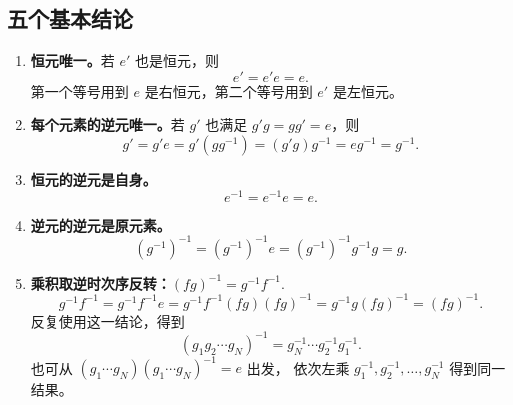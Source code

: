 \subsection{五个基本结论}
\begin{enumerate}
\item \textbf{恒元唯一。}若 $e'$ 也是恒元，则
\begin{equation}
e'=e'e=e.
\end{equation}
第一个等号用到 $e$ 是右恒元，第二个等号用到 $e'$ 是左恒元。

\item \textbf{每个元素的逆元唯一。}若 $g'$ 也满足 $g'g=gg'=e$，则
\begin{equation}
g'=g'e=g'\left(gg^{-1}\right)=\left(g'g\right)g^{-1}=eg^{-1}=g^{-1}.
\end{equation}

\item \textbf{恒元的逆元是自身。}
\begin{equation}
  e^{-1}=e^{-1}e=e.
\end{equation}

\item \textbf{逆元的逆元是原元素。}
\begin{equation}
\left(g^{-1}\right)^{-1}
=\left(g^{-1}\right)^{-1} e
=\left(g^{-1}\right)^{-1} g^{-1} g
=g.
\end{equation}

\item \textbf{乘积取逆时次序反转：}$\left(fg \right)^{-1}=g^{-1} f^{-1} $.
\begin{equation}
  g^{-1} f^{-1}=g^{-1} f^{-1} e = g^{-1} f^{-1} (fg) (fg)^{-1}=g^{-1} g (fg)^{-1}=(fg)^{-1}.
\end{equation}
反复使用这一结论，得到
\begin{equation}
\left(g_1g_2\cdots g_N\right)^{-1}=g_N^{-1}\cdots g_2^{-1}g_1^{-1}.
\end{equation}
也可从 $\left(g_1\cdots g_N\right)\left(g_1\cdots g_N\right)^{-1}=e$ 出发，
依次左乘 $g_1^{-1},g_2^{-1},\ldots,g_N^{-1}$ 得到同一结果。
\end{enumerate}

